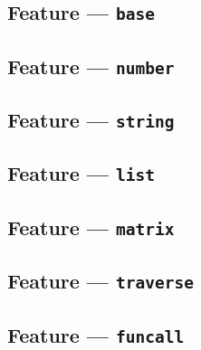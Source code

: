\subsection{Feature --- \texttt{base}} %
\label{sub:feature_base}


\subsection{Feature --- \texttt{number}} %
\label{sub:feature_number}


\subsection{Feature --- \texttt{string}} %
\label{sub:feature_string}


\subsection{Feature --- \texttt{list}} %
\label{sub:feature_list}


\subsection{Feature --- \texttt{matrix}} %
\label{sub:feature_matrix}


\subsection{Feature --- \texttt{traverse}} %
\label{sub:feature_traverse}


\subsection{Feature --- \texttt{funcall}} %
\label{sub:feature_funcall}

